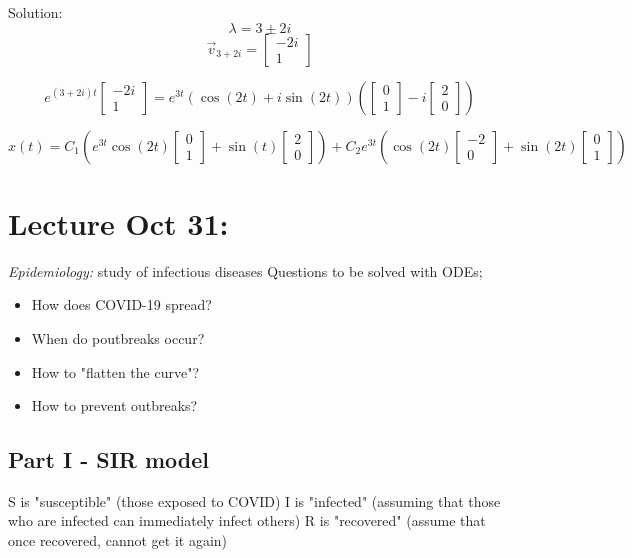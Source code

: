 \documentclass[12pt]{article}
\begin{document}
Solution:
\[\lambda = 3 \pm 2i\]
\[\vec{v}_{3 + 2i} = \begin{bmatrix}
    -2i\\
    1
\end{bmatrix}\] 

\[e^{(3 + 2i)t} \begin{bmatrix}
    -2i\\
    1
\end{bmatrix} = e^{3t} \left(\cos (2t) + i \sin (2t)\right) \left(\begin{bmatrix}
    0\\
    1
\end{bmatrix} - i \begin{bmatrix}
    2\\0
\end{bmatrix}\right)\]

\[x(t) = C_1 \left(e^{3t} \cos (2t) \begin{bmatrix}
    0\\1
\end{bmatrix} + \sin(t) \begin{bmatrix}
    2\\0
\end{bmatrix}\right) + C_2 e^{3t} \left(\cos(2t) \begin{bmatrix}
    -2\\
    0
\end{bmatrix} + \sin (2t) \begin{bmatrix}
    0\\1
\end{bmatrix}\right)\]

\section{Lecture Oct 31:}
\emph{Epidemiology:} study of infectious diseases 
Questions to be solved with ODEs;
\begin{itemize}
    \item How does COVID-19 spread?
    \item When do poutbreaks occur?
    \item How to "flatten the curve"?
    \item How to prevent outbreaks?
\end{itemize}

\subsection*{Part I - SIR model}
S is "susceptible" (those exposed to COVID)
I is "infected" (assuming that those who are infected can immediately infect others)
R is "recovered" (assume that once recovered, cannot get it again)
\end{document}
